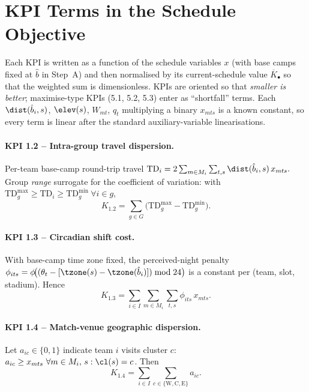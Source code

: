 \section{KPI Terms in the Schedule Objective}
\label{sec:kpi}

Each KPI is written as a function of the schedule variables $x$
(with base camps fixed at $\hat b$ in Step~A) and then normalised by its
current-schedule value $\overline{K}_\bullet$ so that the weighted sum is
dimensionless. KPIs are oriented so that \emph{smaller is better};
maximise-type KPIs (5.1, 5.2, 5.3) enter as ``shortfall'' terms. Each
$\dist(\hat b_i,s)$, $\elev(s)$, $W_{mt}$, $q_t$ multiplying a binary
$x_{mts}$ is a known constant, so every term is linear after the
standard auxiliary-variable linearisations.

\paragraph{KPI 1.2 -- Intra-group travel dispersion.}
Per-team base-camp round-trip travel
$\mathrm{TD}_i=2\sum_{m\in M_i}\sum_{t,s}\dist(\hat b_i,s)\,x_{mts}.$
Group \emph{range} surrogate for the coefficient of variation: with
$\mathrm{TD}_g^{\max}\ge \mathrm{TD}_i\ge \mathrm{TD}_g^{\min}\ \forall
i\in g$,
\begin{equation}
  K_{1.2}=\sum_{g\in G}\bigl(\mathrm{TD}_g^{\max}-\mathrm{TD}_g^{\min}\bigr).
\end{equation}

\paragraph{KPI 1.3 -- Circadian shift cost.}
With base-camp time zone fixed, the perceived-night penalty
$\phi_{its}=\phi\!\bigl((\theta_t-[\tzone(s)-\tzone(\hat b_i)])\bmod 24\bigr)$
is a constant per (team, slot, stadium). Hence
\begin{equation}
  K_{1.3}=\sum_{i\in I}\sum_{m\in M_i}\sum_{t,s}\phi_{its}\,x_{mts}.
\end{equation}

\paragraph{KPI 1.4 -- Match-venue geographic dispersion.}
Let $a_{ic}\in\{0,1\}$ indicate team $i$ visits cluster $c$:
$a_{ic}\ge x_{mts}\ \forall m\in M_i,\,s:\cl(s)=c$. Then
\begin{equation}
  K_{1.4}=\sum_{i\in I}\sum_{c\in\{\mathrm W,\mathrm C,\mathrm E\}} a_{ic}.
\end{equation}

